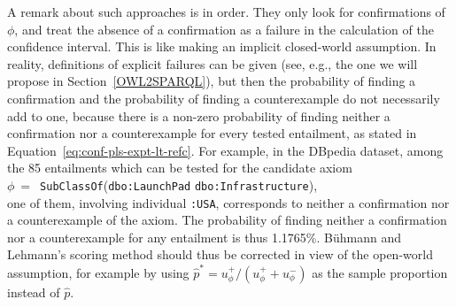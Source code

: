 \documentclass[conference]{IEEEtran}
\begin{document}
A remark about such approaches is in order. They only look for confirmations of $\phi$, and treat
the absence of a confirmation as a failure in the calculation of the confidence interval.
This is like making an implicit closed-world assumption. In reality, definitions
of explicit failures can be given (see, e.g.,
the one we will propose in Section~\ref{OWL2SPARQL}), but then the probability
of finding a confirmation and the probability of finding a counterexample do not necessarily add to one,
because there is a non-zero probability of finding neither a confirmation nor a counterexample
for every tested entailment, as stated in Equation~\ref{eq:conf-pls-expt-lt-refc}.
For example, in the DBpedia dataset, among the 85 entailments which can be tested for the candidate axiom\\
\small
$\phi~=$~\texttt{SubClassOf}(\texttt{dbo:LaunchPad} \texttt{dbo:Infrastructure}),\\
\normalsize
one of them, involving individual  \texttt{:USA},
corresponds to neither a confirmation nor a counterexample of the axiom.
The probability of finding neither a
confirmation nor a counterexample for any entailment is thus 1.1765\%.
B\"uhmann and Lehmann's scoring method should thus be
corrected in view of the open-world assumption, for example by using
$\hat{p}^* = u_\phi^+/(u_\phi^+ + u_\phi^-)$ as the sample proportion instead of $\hat{p}$.


\end{document}
